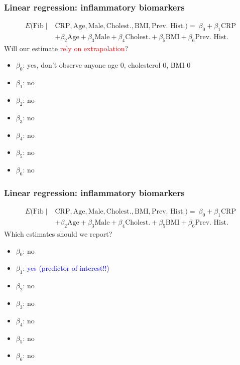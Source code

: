 \documentclass[12pt, 
hyperref={colorlinks=true, linkcolor=blue, urlcolor=cyan},dvipsnames]{beamer}
\begin{document}
\begin{frame}
\frametitle{Linear regression: inflammatory biomarkers}
{\small 
\begin{align*}
E(\text{Fib} \mid & \text{CRP}, \text{Age}, \text{Male}, \text{Cholest.}, \text{BMI}, \text{Prev. Hist.}) =  \ \beta_0 + \beta_1 \text{CRP} \\
&+ \beta_2 \text{Age}  + \beta_3 \text{Male} + \beta_4 \text{Cholest.} + \beta_5 \text{BMI} + \beta_6 \text{Prev. Hist.}
\end{align*}
}
Will our estimate \textcolor{red}{rely on extrapolation}? \vspace{-0.3cm}
\begin{itemize}
\item $\beta_0$: \pause yes, don't observe anyone age 0, cholesterol 0, BMI 0
\item $\beta_1$: \pause no
\item $\beta_2$: no
\item $\beta_3$: no
\item $\beta_4$: no
\item $\beta_5$: no
\item $\beta_6$: no
\end{itemize} 

\end{frame}

\begin{frame}
\frametitle{Linear regression: inflammatory biomarkers}
{\small 
\begin{align*}
E(\text{Fib} \mid & \text{CRP}, \text{Age}, \text{Male}, \text{Cholest.}, \text{BMI}, \text{Prev. Hist.}) =  \ \beta_0 + \beta_1 \text{CRP} \\
&+ \beta_2 \text{Age}  + \beta_3 \text{Male} + \beta_4 \text{Cholest.} + \beta_5 \text{BMI} + \beta_6 \text{Prev. Hist.}
\end{align*}
}
Which estimates should we report?
\begin{itemize}
\item $\beta_0$: \pause no
\item $\beta_1$: \textcolor{blue}{yes (predictor of interest!!)}
\item $\beta_2$: \pause no
\item $\beta_3$: no
\item $\beta_4$: no
\item $\beta_5$: no
\item $\beta_6$: no
\end{itemize}
\end{frame}
\end{document}
